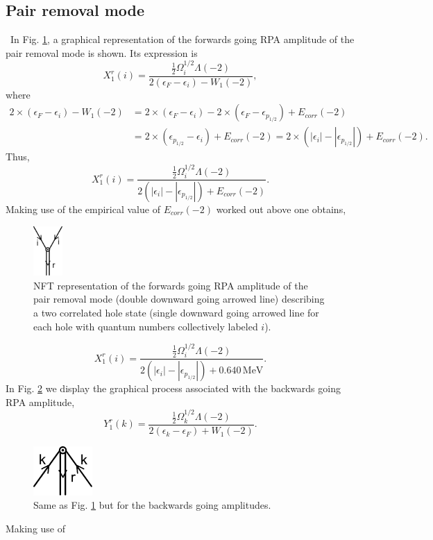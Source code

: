\subsection{Pair removal mode}\
In Fig. \ref{fig1E2}, a graphical representation of the forwards going RPA amplitude of the pair removal mode is shown. Its expression is 
\begin{equation*}
X_1^r(i)=\frac{\frac{1}{2}\Omega_i^{1/2}\Lambda(-2)}{2(\epsilon_F-\epsilon_i)-W_1(-2)},
\end{equation*}
where
\begin{equation*}
\begin{split}
2\times(\epsilon_F-\epsilon_i)-W_1(-2)&=2\times(\epsilon_F-\epsilon_i)-2\times(\epsilon_F-\epsilon_{p_{1/2}})+E_{corr}(-2)\\
&=2\times(\epsilon_{p_{1/2}}-\epsilon_i)+E_{corr}(-2)=2\times(|\epsilon_i|-|\epsilon_{p_{1/2}}|)+E_{corr}(-2).
\end{split}
\end{equation*}
Thus,
\begin{equation*}
X_1^r(i)=\frac{\frac{1}{2}\Omega_i^{1/2}\Lambda(-2)}{2(|\epsilon_i|-|\epsilon_{p_{1/2}}|)+E_{corr}(-2)}.
\end{equation*}
Making use of the empirical value of $E_{corr}(-2)$ worked out above one obtains, 
  \begin{figure}
  \centerline{\includegraphics*[width=0.1\textwidth,angle=0]{nutshell/figs/removal_forward.pdf}}
  \caption{NFT representation of the forwards going RPA amplitude of the pair removal mode (double downward going arrowed line) describing a two correlated hole state (single downward going arrowed line for each hole with quantum numbers collectively labeled $i$).}\label{fig1E2}
  \end{figure}
\begin{equation*}
X_1^r(i)=\frac{\frac{1}{2}\Omega_i^{1/2}\Lambda(-2)}{2(|\epsilon_i|-|\epsilon_{p_{1/2}}|)+0.640\,\text{MeV}}.
\end{equation*}
In Fig. \ref{fig1E3} we display the graphical process associated with the backwards going RPA amplitude,
\begin{equation*}
Y_1^r(k)=\frac{\frac{1}{2}\Omega_k^{1/2}\Lambda(-2)}{2(\epsilon_k-\epsilon_F)+W_1(-2)}.
\end{equation*}
  \begin{figure}
  \centerline{\includegraphics*[width=0.2\textwidth,angle=0]{nutshell/figs/removal_backward.pdf}}
  \caption{Same as Fig. \ref{fig1E2} but for the backwards going amplitudes.}\label{fig1E3}
  \end{figure}
  Making use of


